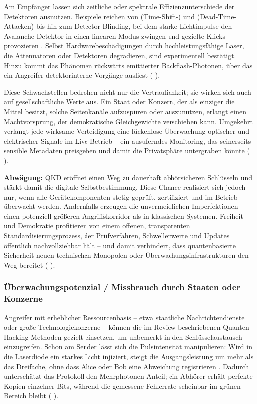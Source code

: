 Am Empfänger lassen sich zeitliche oder spektrale Effizienzunterschiede der Detektoren ausnutzen. Beispiele reichen von (Time-Shift-) und (Dead-Time-Attacken) bis hin zum Detector-Blinding, bei dem starke Lichtimpulse den Avalanche-Detektor in einen linearen Modus zwingen und gezielte Klicks provozieren . Selbst Hardwarebeschädigungen durch hochleistungsfähige Laser, die Attenuatoren oder Detektoren degradieren, sind experimentell bestätigt. Hinzu kommt das Phänomen rückwärts emittierter Backflash-Photonen, über das ein Angreifer detektorinterne Vorgänge ausliest (\cite{sunReviewSecurityEvaluation2022} ).

Diese Schwachstellen bedrohen nicht nur die Vertraulichkeit; sie wirken sich auch auf gesellschaftliche Werte aus. Ein Staat oder Konzern, der als einziger die Mittel besitzt, solche Seitenkanäle aufzuspüren oder auszunutzen, erlangt einen Machtvorsprung, der demokratische Gleichgewichte verschieben kann. Umgekehrt verlangt jede wirksame Verteidigung eine lückenlose Überwachung optischer und elektrischer Signale im Live-Betrieb – ein ausuferndes Monitoring, das seinerseits sensible Metadaten preisgeben und damit die Privatsphäre untergraben könnte (\cite{sunReviewSecurityEvaluation2022} ).

\textbf{Abwägung:}
QKD eröffnet einen Weg zu dauerhaft abhörsicheren Schlüsseln und stärkt damit die digitale Selbstbestimmung. Diese Chance realisiert sich jedoch nur, wenn alle Gerätekomponenten stetig geprüft, zertifiziert und im Betrieb überwacht werden. Andernfalls erzeugen die unvermeidlichen Imperfektionen einen potenziell größeren Angriffskorridor als in klassischen Systemen. Freiheit und Demokratie profitieren von einem offenen, transparenten Standardisierungsprozess, der Prüfverfahren, Schwellenwerte und Updates öffentlich nachvollziehbar hält – und damit verhindert, dass quantenbasierte Sicherheit neuen technischen Monopolen oder Überwachungsinfrastrukturen den Weg bereitet (\cite{sunReviewSecurityEvaluation2022} ).

\subsubsection{Überwachungspotenzial / Missbrauch durch Staaten oder Konzerne}
Angreifer mit erheblicher Ressourcenbasis – etwa staatliche Nachrichtendienste oder große Technologiekonzerne – können die im Review beschriebenen Quanten-Hacking-Methoden gezielt einsetzen, um unbemerkt in den Schlüsselaustausch einzugreifen. Schon am Sender lässt sich die Pulsintensität manipulieren: Wird in die Laserdiode ein starkes Licht injiziert, steigt die Ausgangsleistung um mehr als das Dreifache, ohne dass Alice oder Bob eine Abweichung registrieren . Dadurch unterschätzt das Protokoll den Mehrphotonen-Anteil; ein Abhörer erhält perfekte Kopien einzelner Bits, während die gemessene Fehlerrate scheinbar im grünen Bereich bleibt (\cite{sunReviewSecurityEvaluation2022} ).

